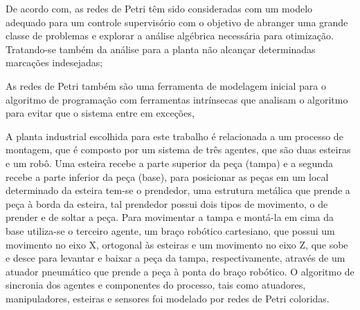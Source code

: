 De acordo com\cite{discrete}, as redes de Petri têm sido consideradas com um modelo adequado para um controle supervisório com o objetivo de abranger uma grande classe de problemas e explorar a análise algébrica necessária para otimização. Tratando-se também da análise para a planta não alcançar determinadas marcações indesejadas;

As redes de Petri também são uma ferramenta de modelagem inicial para o algoritmo de programação com ferramentas intrínsecas que analisam o algoritmo para evitar que o sistema entre em exceções,\cite{embeddedOO}


A planta industrial escolhida para este trabalho é relacionada a um processo de montagem, que é composto por um sistema de três agentes, que são duas esteiras e um robô. Uma esteira recebe a parte superior da peça (tampa) e a segunda recebe a parte inferior da peça (base), para posicionar as peças em um local determinado da esteira tem-se o prendedor, uma estrutura metálica que prende a peça à borda da esteira, tal prendedor possui dois tipos de movimento, o de prender e de soltar a peça. Para movimentar a tampa e montá-la em cima da base utiliza-se  o terceiro agente, um braço robótico cartesiano, que possui um movimento no eixo X, ortogonal às esteiras e um movimento no eixo Z, que sobe e desce para levantar e baixar a peça da tampa, respectivamente, através de um atuador pneumático que prende a peça à ponta do braço robótico. O algoritmo de sincronia dos agentes e componentes do processo, tais como atuadores, manipuladores, esteiras e sensores foi modelado por redes de Petri coloridas.


